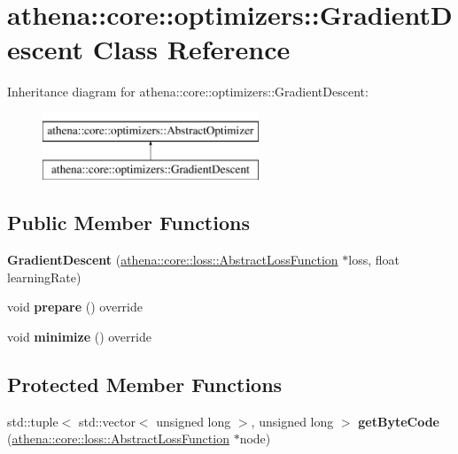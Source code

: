 \hypertarget{classathena_1_1core_1_1optimizers_1_1_gradient_descent}{}\section{athena\+:\+:core\+:\+:optimizers\+:\+:Gradient\+Descent Class Reference}
\label{classathena_1_1core_1_1optimizers_1_1_gradient_descent}
Inheritance diagram for athena\+:\+:core\+:\+:optimizers\+:\+:Gradient\+Descent\+:\begin{figure}[H]
\begin{center}
\leavevmode
\includegraphics[height=2.000000cm]{dd/d53/classathena_1_1core_1_1optimizers_1_1_gradient_descent}
\end{center}
\end{figure}
\subsection*{Public Member Functions}
\begin{DoxyCompactItemize}
\item 
\mbox{\label{classathena_1_1core_1_1optimizers_1_1_gradient_descent_a1f81ba3b4a6291f37a33f7eb903ecdfe}} 
{\bfseries Gradient\+Descent} (\mbox{\hyperlink{classathena_1_1core_1_1loss_1_1_abstract_loss_function}{athena\+::core\+::loss\+::\+Abstract\+Loss\+Function}} $\ast$loss, float learning\+Rate)
\item 
\mbox{\label{classathena_1_1core_1_1optimizers_1_1_gradient_descent_ab9ecd3b02a82c86bfaaa3d93789d2d5a}} 
void {\bfseries prepare} () override
\item 
\mbox{\label{classathena_1_1core_1_1optimizers_1_1_gradient_descent_a1403aaa8543b4f50e783ae19b26e2ea4}} 
void {\bfseries minimize} () override
\end{DoxyCompactItemize}
\subsection*{Protected Member Functions}
\begin{DoxyCompactItemize}
\item 
\mbox{\label{classathena_1_1core_1_1optimizers_1_1_gradient_descent_afadd2e418a6ed2a2b025b5cffdfa7d4c}} 
std\+::tuple$<$ std\+::vector$<$ unsigned long $>$, unsigned long $>$ {\bfseries get\+Byte\+Code} (\mbox{\hyperlink{classathena_1_1core_1_1loss_1_1_abstract_loss_function}{athena\+::core\+::loss\+::\+Abstract\+Loss\+Function}} $\ast$node)
\end{DoxyCompactItemize}
